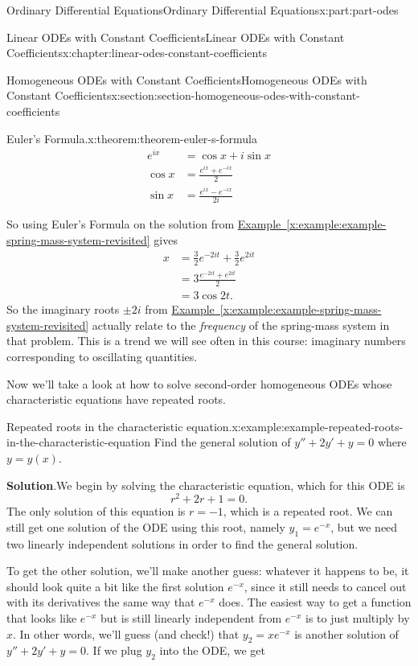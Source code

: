 \documentclass[oneside,10pt,]{book}
\newcommand{\blocktitlefont}{\relax}
\newcommand{\xreffont}{\relax}
\numberwithin{equation}{part}
\newcommand{\amp}{&}
\begin{document}
\begin{partptx}{Ordinary Differential Equations}{}{Ordinary Differential Equations}{}{}{x:part:part-odes}
\begin{chapterptx}{Linear ODEs with Constant Coefficients}{}{Linear ODEs with Constant Coefficients}{}{}{x:chapter:linear-odes-constant-coefficients}
\begin{sectionptx}{Homogeneous ODEs with Constant Coefficients}{}{Homogeneous ODEs with Constant Coefficients}{}{}{x:section:section-homogeneous-odes-with-constant-coefficients}
\begin{theorem}{Euler's Formula.}{}{x:theorem:theorem-euler-s-formula}
\begin{align*}
e^{ix} \amp = \cos x + i\sin x \\
\cos x \amp = \frac{e^{ix}+e^{-ix}}{2} \\
\sin x \amp = \frac{e^{ix} - e^{-ix}}{2i} 
\end{align*}
%
\end{theorem}
So using Euler's Formula on the solution from \hyperref[x:example:example-spring-mass-system-revisited]{Example~{\xreffont\ref{x:example:example-spring-mass-system-revisited}}} gives%
\begin{align*}
x \amp = \frac{3}{2}e^{-2it} + \frac{3}{2} e^{2it} \\
\amp = 3\frac{e^{-2it} + e^{2it}}{2} \\
\amp = 3\cos2t. 
\end{align*}
So the imaginary roots \(\pm2i\) from \hyperref[x:example:example-spring-mass-system-revisited]{Example~{\xreffont\ref{x:example:example-spring-mass-system-revisited}}} actually relate to the \emph{frequency} of the spring-mass system in that problem. This is a trend we will see often in this course: imaginary numbers corresponding to oscillating quantities.%
\par
Now we'll take a look at how to solve second-order homogeneous ODEs whose characteristic equations have repeated roots.%
\begin{example}{Repeated roots in the characteristic equation.}{x:example:example-repeated-roots-in-the-characteristic-equation}%
Find the general solution of \(y'' + 2y' + y = 0\) where \(y = y(x)\).%
\par\smallskip%
\noindent\textbf{\blocktitlefont Solution}.\hypertarget{g:solution:idp105548780338976}{}\quad{}We begin by solving the characteristic equation, which for this ODE is%
\begin{equation*}
r^{2} + 2r + 1 = 0.
\end{equation*}
The only solution of this equation is \(r=-1\), which is a repeated root. We can still get one solution of the ODE using this root, namely \(y_{1} = e^{-x}\), but we need two linearly independent solutions in order to find the general solution.%
\par
To get the other solution, we'll make another guess: whatever it happens to be, it should look quite a bit like the first solution \(e^{-x}\), since it still needs to cancel out with its derivatives the same way that \(e^{-x}\) does. The easiest way to get a function that looks like \(e^{-x}\) but is still linearly independent from \(e^{-x}\) is to just multiply by \(x\). In other words, we'll guess (and check!) that \(y_{2} = xe^{-x}\) is another solution of \(y''+2y'+y = 0\). If we plug \(y_{2}\) into the ODE, we get%

\end{example}
\end{sectionptx}
\end{chapterptx}
\end{partptx}
\end{document}
